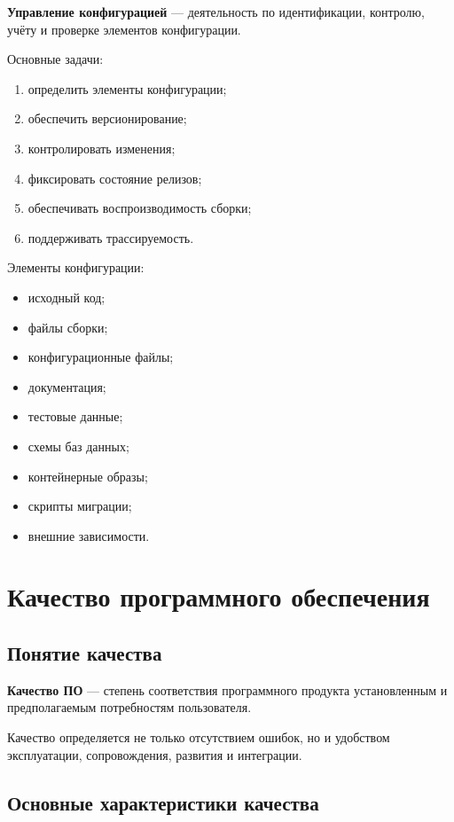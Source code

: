 \documentclass[12pt,a4paper]{article}
\begin{document}
\textbf{Управление конфигурацией} --- деятельность по идентификации, контролю, учёту и проверке элементов конфигурации.

Основные задачи:
\begin{enumerate}
    \item определить элементы конфигурации;
    \item обеспечить версионирование;
    \item контролировать изменения;
    \item фиксировать состояние релизов;
    \item обеспечивать воспроизводимость сборки;
    \item поддерживать трассируемость.
\end{enumerate}

Элементы конфигурации:
\begin{itemize}
    \item исходный код;
    \item файлы сборки;
    \item конфигурационные файлы;
    \item документация;
    \item тестовые данные;
    \item схемы баз данных;
    \item контейнерные образы;
    \item скрипты миграции;
    \item внешние зависимости.
\end{itemize}

\section{Качество программного обеспечения}

\subsection{Понятие качества}

\textbf{Качество ПО} --- степень соответствия программного продукта установленным и предполагаемым потребностям пользователя.

Качество определяется не только отсутствием ошибок, но и удобством эксплуатации, сопровождения, развития и интеграции.

\subsection{Основные характеристики качества}
\end{document}
